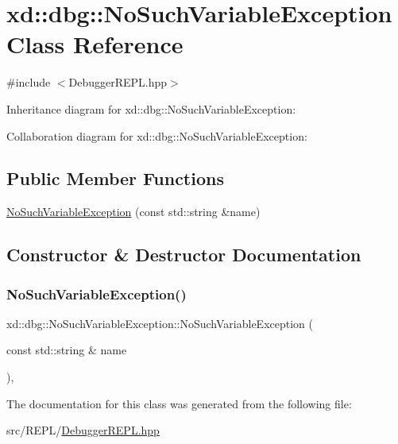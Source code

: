 \hypertarget{classxd_1_1dbg_1_1_no_such_variable_exception}{}\section{xd\+:\+:dbg\+:\+:No\+Such\+Variable\+Exception Class Reference}
\label{classxd_1_1dbg_1_1_no_such_variable_exception}


{\ttfamily \#include $<$Debugger\+R\+E\+P\+L.\+hpp$>$}



Inheritance diagram for xd\+:\+:dbg\+:\+:No\+Such\+Variable\+Exception\+:


Collaboration diagram for xd\+:\+:dbg\+:\+:No\+Such\+Variable\+Exception\+:
\subsection*{Public Member Functions}
\begin{DoxyCompactItemize}
\item 
\mbox{\hyperlink{classxd_1_1dbg_1_1_no_such_variable_exception_a6dd37967836e1d437f5bbefa8dc9d11d}{No\+Such\+Variable\+Exception}} (const std\+::string \&name)
\end{DoxyCompactItemize}


\subsection{Constructor \& Destructor Documentation}
\mbox{\label{classxd_1_1dbg_1_1_no_such_variable_exception_a6dd37967836e1d437f5bbefa8dc9d11d}} 
\subsubsection{\texorpdfstring{No\+Such\+Variable\+Exception()}{NoSuchVariableException()}}
{\footnotesize\ttfamily xd\+::dbg\+::\+No\+Such\+Variable\+Exception\+::\+No\+Such\+Variable\+Exception (\begin{DoxyParamCaption}\item[{const std\+::string \&}]{name }\end{DoxyParamCaption})\hspace{0.3cm}{\ttfamily [inline]}, {\ttfamily [explicit]}}



The documentation for this class was generated from the following file\+:\begin{DoxyCompactItemize}
\item 
src/\+R\+E\+P\+L/\mbox{\hyperlink{_debugger_r_e_p_l_8hpp}{Debugger\+R\+E\+P\+L.\+hpp}}\end{DoxyCompactItemize}
